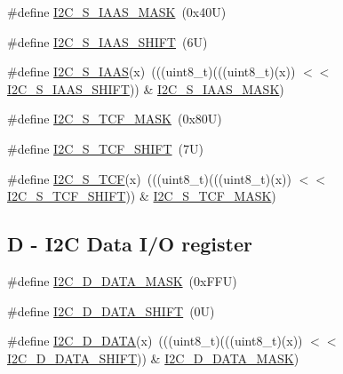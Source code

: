 \begin{DoxyCompactItemize}
\item 
\#define \mbox{\hyperlink{group___i2_c___register___masks_ga2d60d97ef284aae3bcec1b9b9135a37f}{I2\+C\+\_\+\+S\+\_\+\+I\+A\+A\+S\+\_\+\+M\+A\+SK}}~(0x40\+U)
\item 
\#define \mbox{\hyperlink{group___i2_c___register___masks_gaeef3ccc64a102f940ad82af4c5558381}{I2\+C\+\_\+\+S\+\_\+\+I\+A\+A\+S\+\_\+\+S\+H\+I\+FT}}~(6\+U)
\item 
\#define \mbox{\hyperlink{group___i2_c___register___masks_gad09259671dff856203dcd5e547a2e53a}{I2\+C\+\_\+\+S\+\_\+\+I\+A\+AS}}(x)~(((uint8\+\_\+t)(((uint8\+\_\+t)(x)) $<$$<$ \mbox{\hyperlink{group___i2_c___register___masks_gaeef3ccc64a102f940ad82af4c5558381}{I2\+C\+\_\+\+S\+\_\+\+I\+A\+A\+S\+\_\+\+S\+H\+I\+FT}})) \& \mbox{\hyperlink{group___i2_c___register___masks_ga2d60d97ef284aae3bcec1b9b9135a37f}{I2\+C\+\_\+\+S\+\_\+\+I\+A\+A\+S\+\_\+\+M\+A\+SK}})
\item 
\#define \mbox{\hyperlink{group___i2_c___register___masks_ga20501abab9a2b23ac99fa69e87b2730d}{I2\+C\+\_\+\+S\+\_\+\+T\+C\+F\+\_\+\+M\+A\+SK}}~(0x80\+U)
\item 
\#define \mbox{\hyperlink{group___i2_c___register___masks_ga030264ea4205860abb6a32331d84cef3}{I2\+C\+\_\+\+S\+\_\+\+T\+C\+F\+\_\+\+S\+H\+I\+FT}}~(7\+U)
\item 
\#define \mbox{\hyperlink{group___i2_c___register___masks_gad01c50b9058e88ffc519e7ffae8c76fc}{I2\+C\+\_\+\+S\+\_\+\+T\+CF}}(x)~(((uint8\+\_\+t)(((uint8\+\_\+t)(x)) $<$$<$ \mbox{\hyperlink{group___i2_c___register___masks_ga030264ea4205860abb6a32331d84cef3}{I2\+C\+\_\+\+S\+\_\+\+T\+C\+F\+\_\+\+S\+H\+I\+FT}})) \& \mbox{\hyperlink{group___i2_c___register___masks_ga20501abab9a2b23ac99fa69e87b2730d}{I2\+C\+\_\+\+S\+\_\+\+T\+C\+F\+\_\+\+M\+A\+SK}})
\end{DoxyCompactItemize}
\subsection*{D -\/ I2C Data I/O register}
\begin{DoxyCompactItemize}
\item 
\#define \mbox{\hyperlink{group___i2_c___register___masks_gaeb11bc3736eba5b805bdc4bced7edb2e}{I2\+C\+\_\+\+D\+\_\+\+D\+A\+T\+A\+\_\+\+M\+A\+SK}}~(0x\+F\+F\+U)
\item 
\#define \mbox{\hyperlink{group___i2_c___register___masks_gac9b220edf37227949c367bf455d11a04}{I2\+C\+\_\+\+D\+\_\+\+D\+A\+T\+A\+\_\+\+S\+H\+I\+FT}}~(0\+U)
\item 
\#define \mbox{\hyperlink{group___i2_c___register___masks_ga7b68b1d5f1aa40f4bc5e9310e0a63754}{I2\+C\+\_\+\+D\+\_\+\+D\+A\+TA}}(x)~(((uint8\+\_\+t)(((uint8\+\_\+t)(x)) $<$$<$ \mbox{\hyperlink{group___i2_c___register___masks_gac9b220edf37227949c367bf455d11a04}{I2\+C\+\_\+\+D\+\_\+\+D\+A\+T\+A\+\_\+\+S\+H\+I\+FT}})) \& \mbox{\hyperlink{group___i2_c___register___masks_gaeb11bc3736eba5b805bdc4bced7edb2e}{I2\+C\+\_\+\+D\+\_\+\+D\+A\+T\+A\+\_\+\+M\+A\+SK}})
\end{DoxyCompactItemize}
